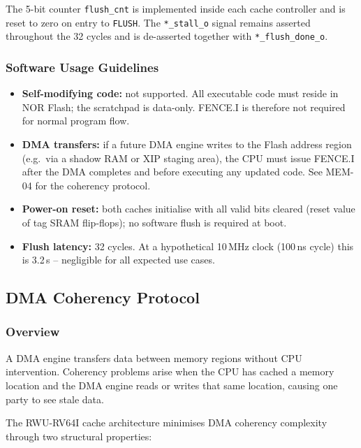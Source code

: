 The 5-bit counter \texttt{flush\_cnt} is implemented inside each cache
controller and is reset to zero on entry to \texttt{FLUSH}.
The \texttt{*\_stall\_o} signal remains asserted throughout the 32
cycles and is de-asserted together with \texttt{*\_flush\_done\_o}.

\subsubsection{Software Usage Guidelines}

\begin{itemize}
  \item \textbf{Self-modifying code:} not supported.
    All executable code must reside in NOR Flash; the scratchpad is
    data-only.
    FENCE.I is therefore not required for normal program flow.
  \item \textbf{DMA transfers:} if a future DMA engine writes to the
    Flash address region (e.g.\ via a shadow RAM or XIP staging area),
    the CPU must issue FENCE.I after the DMA completes and before
    executing any updated code.
    See MEM-04 for the coherency protocol.
  \item \textbf{Power-on reset:} both caches initialise with all valid
    bits cleared (reset value of tag SRAM flip-flops); no software flush
    is required at boot.
  \item \textbf{Flush latency:} 32 cycles.
    At a hypothetical 10\,MHz clock (100\,ns cycle) this is 3.2\,\textmu s
    -- negligible for all expected use cases.
\end{itemize}

\subsection{DMA Coherency Protocol}
\label{subsec:dmaCoherency}

\subsubsection{Overview}

A DMA engine transfers data between memory regions without CPU intervention.
Coherency problems arise when the CPU has cached a memory location and the
DMA engine reads or writes that same location, causing one party to see
stale data.

The RWU-RV64I cache architecture minimises DMA coherency complexity through
two structural properties:

